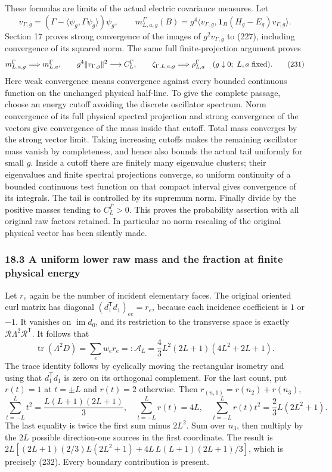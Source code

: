 \documentclass[
  11pt,
]{article}
\begin{document}
These formulas are limits of the actual electric covariance measures.
Let \[
 v_{\Gamma,g}=(\Gamma-\langle\psi_g,\Gamma\psi_g\rangle)\psi_g,
 \qquad
 m_{L,a,g}^{\Gamma}(B)
 =g^4\langle v_{\Gamma,g},
           \mathbf1_B(H_g-E_g)v_{\Gamma,g}\rangle.
 \tag{230}
\] Section 17 proves strong convergence of the images of
\(g^2v_{\Gamma,g}\) to (227), including convergence of its squared norm.
The same full finite-projection argument proves \[
 m_{L,a,g}^{\Gamma}\Longrightarrow m_{L,a}^{\Gamma},\qquad
 g^4\|v_{\Gamma,g}\|^2\longrightarrow C_L^\Gamma,\qquad
 \zeta_{\Gamma,L,a,g}\Longrightarrow\rho_{L,a}^{\Gamma}
 \quad(g\downarrow0;\ L,a\ \hbox{fixed}).
 \tag{231}
\] Here weak convergence means convergence against every bounded
continuous function on the unchanged physical half-line. To give the
complete passage, choose an energy cutoff avoiding the discrete
oscillator spectrum. Norm convergence of its full physical spectral
projection and strong convergence of the vectors give convergence of the
mass inside that cutoff. Total mass converges by the strong vector
limit. Taking increasing cutoffs makes the remaining oscillator mass
vanish by completeness, and hence also bounds the actual tail uniformly
for small \(g\). Inside a cutoff there are finitely many eigenvalue
clusters; their eigenvalues and finite spectral projections converge, so
uniform continuity of a bounded continuous test function on that compact
interval gives convergence of its integrals. The tail is controlled by
its supremum norm. Finally divide by the positive masses tending to
\(C_L^\Gamma>0\). This proves the probability assertion with all
original raw factors retained. In particular no norm rescaling of the
original physical vector has been silently made.

\subsubsection{18.3 A uniform lower raw mass and the fraction at finite
physical
energy}\label{a-uniform-lower-raw-mass-and-the-fraction-at-finite-physical-energy}

Let \(r_e\) again be the number of incident elementary faces. The
original oriented curl matrix has diagonal
\((d_1^{\mathsf T}d_1)_{ee}=r_e\), because each incidence coefficient is
\(1\) or \(-1\). It vanishes on \(\operatorname{im}d_0\), and its
restriction to the transverse space is exactly
\(\mathscr R\Lambda^2\mathscr R^{\mathsf T}\). It follows that \[
 \operatorname{tr}(\Lambda^2D)=\sum_e w_e r_e
   =:\mathcal A_L
   =\frac43 L^2(2L+1)(4L^2+2L+1).
 \tag{232}
\] The trace identity follows by cyclically moving the rectangular
isometry and using that \(d_1^{\mathsf T}d_1\) is zero on its orthogonal
complement. For the last count, put \(r(t)=1\) at \(t=\pm L\) and
\(r(t)=2\) otherwise. Then \(r_{(n,1)}=r(n_2)+r(n_3)\), \[
 \sum_{t=-L}^L t^2=\frac{L(L+1)(2L+1)}3,\quad
 \sum_{t=-L}^L r(t)=4L,\quad
 \sum_{t=-L}^L r(t)t^2=\frac23L(2L^2+1).
\] The last equality is twice the first sum minus \(2L^2\). Sum over
\(n_3\), then multiply by the \(2L\) possible direction-one sources in
the first coordinate. The result is \(2L[(2L+1)(2/3)L(2L^2+1)
+4L\,L(L+1)(2L+1)/3]\), which is precisely (232). Every boundary
contribution is present.
\end{document}
